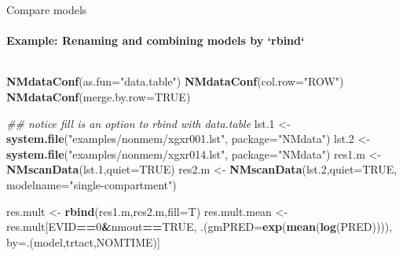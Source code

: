 \documentclass[
  8pt,
  ignorenonframetext,
  aspectratio=169]{beamer}
\newenvironment{Shaded}{\begin{snugshade}}{\end{snugshade}}
\newcommand{\CommentTok}[1]{\textcolor[rgb]{0.56,0.35,0.01}{\textit{#1}}}
\newcommand{\DataTypeTok}[1]{\textcolor[rgb]{0.13,0.29,0.53}{#1}}
\newcommand{\DecValTok}[1]{\textcolor[rgb]{0.00,0.00,0.81}{#1}}
\newcommand{\FloatTok}[1]{\textcolor[rgb]{0.00,0.00,0.81}{#1}}
\newcommand{\KeywordTok}[1]{\textcolor[rgb]{0.13,0.29,0.53}{\textbf{#1}}}
\newcommand{\NormalTok}[1]{#1}
\newcommand{\OperatorTok}[1]{\textcolor[rgb]{0.81,0.36,0.00}{\textbf{#1}}}
\newcommand{\OtherTok}[1]{\textcolor[rgb]{0.56,0.35,0.01}{#1}}
\newcommand{\StringTok}[1]{\textcolor[rgb]{0.31,0.60,0.02}{#1}}
\begin{document}
\begin{frame}[fragile]{Compare models}
\protect\hypertarget{compare-models}{}
\framesubtitle{Example: Renaming and combining models by `rbind`}

\begin{columns}[T]
\begin{column}{0.45\textwidth}
\footnotesize

\begin{Shaded}
\begin{Highlighting}[]
\KeywordTok{NMdataConf}\NormalTok{(}\DataTypeTok{as.fun=}\StringTok{"data.table"}\NormalTok{)}
\KeywordTok{NMdataConf}\NormalTok{(}\DataTypeTok{col.row=}\StringTok{"ROW"}\NormalTok{)}
\KeywordTok{NMdataConf}\NormalTok{(}\DataTypeTok{merge.by.row=}\OtherTok{TRUE}\NormalTok{)}
\end{Highlighting}
\end{Shaded}

\begin{Shaded}
\begin{Highlighting}[]
\CommentTok{\#\# notice fill is an option to rbind with data.table}
\NormalTok{lst}\FloatTok{.1}\NormalTok{ \textless{}{-}}\StringTok{ }\KeywordTok{system.file}\NormalTok{(}\StringTok{"examples/nonmem/xgxr001.lst"}\NormalTok{,}
                     \DataTypeTok{package=}\StringTok{"NMdata"}\NormalTok{)}
\NormalTok{lst}\FloatTok{.2}\NormalTok{ \textless{}{-}}\StringTok{ }\KeywordTok{system.file}\NormalTok{(}\StringTok{"examples/nonmem/xgxr014.lst"}\NormalTok{,}
                     \DataTypeTok{package=}\StringTok{"NMdata"}\NormalTok{)}
\NormalTok{res1.m \textless{}{-}}\StringTok{ }\KeywordTok{NMscanData}\NormalTok{(lst}\FloatTok{.1}\NormalTok{,}\DataTypeTok{quiet=}\OtherTok{TRUE}\NormalTok{)}
\NormalTok{res2.m \textless{}{-}}\StringTok{ }\KeywordTok{NMscanData}\NormalTok{(lst}\FloatTok{.2}\NormalTok{,}\DataTypeTok{quiet=}\OtherTok{TRUE}\NormalTok{,}
                     \DataTypeTok{modelname=}\StringTok{"single{-}compartment"}\NormalTok{)}

\NormalTok{res.mult \textless{}{-}}\StringTok{ }\KeywordTok{rbind}\NormalTok{(res1.m,res2.m,}\DataTypeTok{fill=}\NormalTok{T)}
\NormalTok{res.mult.mean \textless{}{-}}\StringTok{ }\NormalTok{res.mult[EVID}\OperatorTok{==}\DecValTok{0}\OperatorTok{\&}\NormalTok{nmout}\OperatorTok{==}\OtherTok{TRUE}\NormalTok{,}
\NormalTok{                          .(}\DataTypeTok{gmPRED=}\KeywordTok{exp}\NormalTok{(}\KeywordTok{mean}\NormalTok{(}\KeywordTok{log}\NormalTok{(PRED)))),}
\NormalTok{                          by=.(model,trtact,NOMTIME)]}


\end{Highlighting}
\end{Shaded}
\end{column}
\end{columns}
\end{frame}
\end{document}
